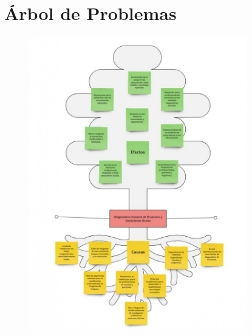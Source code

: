 
\appendix
\setcounter{section}{0}%
\renewcommand{\thesection}{\Alph{section}}%
	
	\section{Árbol de Problemas}
	\label{anexo1}
	\begin{figure}[h]
		\begin{center}
			\includegraphics[width=0.85\textwidth]{anexos/arbol_problematica.jpg}
		\end{center}
	\end{figure}
	\clearpage

